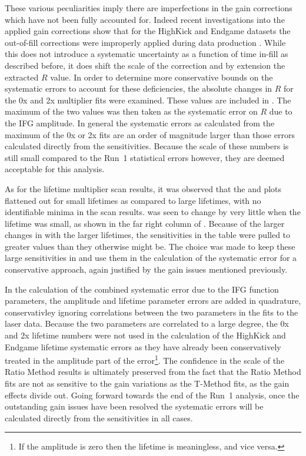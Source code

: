 These various peculiarities imply there are imperfections in the gain corrections which have not been fully accounted for. Indeed recent investigations into the applied gain corrections show that for the HighKick and Endgame datasets the out-of-fill corrections were improperly applied during data production \cite{GainOscEndgameHighKick}. While this does not introduce a systematic uncertainty as a function of time in-fill as described before, it does shift the scale of the correction and by extension the extracted $R$ value. In order to determine more conservative bounds on the systematic errors to account for these deficiencies, the absolute changes in $R$ for the 0x and 2x multiplier fits were examined. These values are included in . The maximum of the two values was then taken as the systematic error on $R$ due to the IFG amplitude. In general the systematic errors as calculated from the maximum of the 0x or 2x fits are an order of magnitude larger than those errors calculated directly from the sensitivities. Because the scale of these numbers is still small compared to the Run~1 statistical errors however, they are deemed acceptable for this analysis. 

As for the lifetime multiplier scan results, it was observed that the \R and \chisq plots flattened out for small lifetimes as compared to large lifetimes, with no identifiable minima in the scan results. \R was seen to change by very little when the lifetime was small, as shown in the far right column of . Because of the larger changes in \R with the larger lifetimes, the sensitivities in the table were pulled to greater values than they otherwise might be. The choice was made to keep these large sensitivities in and use them in the calculation of the systematic error for a conservative approach, again justified by the gain issues mentioned previously.

In the calculation of the combined systematic error due to the IFG function parameters, the amplitude and lifetime parameter errors are added in quadrature, conservativley ignoring correlations between the two parameters in the fits to the laser data. Because the two parameters are correlated to a large degree, the 0x and 2x lifetime numbers were not used in the calculation of the HighKick and Endgame lifetime systematic errors as they have already been conservatively treated in the amplitude part of the error\footnote{If the amplitude is zero then the lifetime is meaningless, and vice versa.}. The confidence in the scale of the Ratio Method results is ultimately preserved from the fact that the Ratio Method fits are not as sensitive to the gain variations as the T-Method fits, as the gain effects divide out. Going forward towards the end of the Run~1 analysis, once the outstanding gain issues have been resolved the systematic errors will be calculated directly from the sensitivities in all cases.


